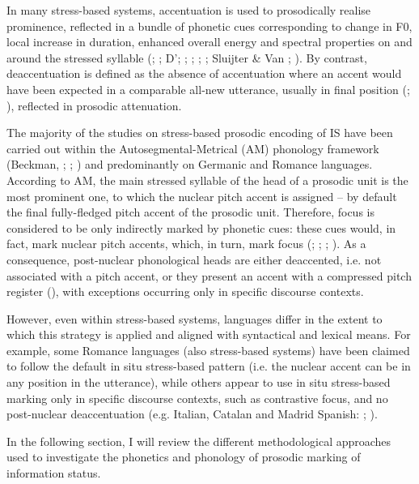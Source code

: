 In many stress-based systems, accentuation is used to prosodically realise prominence, reflected in a bundle of phonetic cues corresponding to change in F0, local increase in duration, enhanced overall energy and spectral properties on and around the stressed syllable (\citealt{BaumannWinter2018}; \citealt{Campbell1995}; D’\citealt{Imperio2000}; \citealt{Heldner2003}; \citealt{HermesRump1994}; \citealt{KochanskiEtAl2005}; \citealt{KüglerCalhoun2020}; Sluijter \& Van \citealt{Heuven1996}; \citealt{Turk2012}). By contrast, deaccentuation is defined as the absence of accentuation where an accent would have been expected in a comparable all-new utterance, usually in final position (\citealt{Cruttenden1997}; \citealt{Ladd1980}), reflected in prosodic attenuation.

The majority of the studies on stress-based prosodic encoding of IS have been carried out within the Autosegmental-Metrical (AM) phonology framework (Beckman, \citealt{HirschbergShattuck-Hufnagel2005}; \citealt{Ladd2008}; \citealt{Pierrehumbert1980}) and predominantly on Germanic and Romance languages. According to AM, the main stressed syllable of the head of a prosodic unit is the most prominent one, to which the nuclear pitch accent is assigned – by default the final fully-fledged pitch accent of the prosodic unit. Therefore, focus is considered to be only indirectly marked by phonetic cues: these cues would, in fact, mark nuclear pitch accents, which, in turn, mark focus (\citealt{Büring2016}; \citealt{Calhoun2010}; \citealt{Ladd2008}; \citealt{Selkirk1995}). As a consequence, post-nuclear phonological heads are either deaccented, i.e. not associated with a pitch accent, or they present an accent with a compressed pitch register (\citealt{KüglerFéry2017}), with exceptions occurring only in specific discourse contexts.

However, even within stress-based systems, languages differ in the extent to which this strategy is applied and aligned with syntactical and lexical means. For example, some Romance languages (also stress-based systems) have been claimed to follow the default in situ stress-based pattern (i.e. the nuclear accent can be in any position in the utterance), while others appear to use in situ stress-based marking only in specific discourse contexts, such as contrastive focus, and no post-nuclear deaccentuation (e.g. Italian, Catalan and Madrid Spanish: \citealt{FrotaPrieto2015}; \citealt{VanrellFernández-Soriano2018}).

In the following section, I will review the different methodological approaches used to investigate the phonetics and phonology of prosodic marking of information status. 

